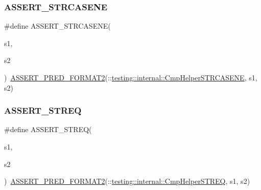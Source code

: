 \mbox{\label{_obj__test_2lib_2googletest-release-1_88_81_2googletest_2include_2gtest_2gtest_8h_ac3d2c3836b103068a050f32585b2aaad}} 
\subsubsection{\texorpdfstring{ASSERT\_STRCASENE}{ASSERT\_STRCASENE}}
{\footnotesize\ttfamily \#define A\+S\+S\+E\+R\+T\+\_\+\+S\+T\+R\+C\+A\+S\+E\+NE(\begin{DoxyParamCaption}\item[{}]{s1,  }\item[{}]{s2 }\end{DoxyParamCaption})~\mbox{\hyperlink{_obj__test_2lib_2googletest-release-1_88_81_2googletest_2include_2gtest_2gtest__pred__impl_8h_ac452685a1a98ea3d96eb956a062ee210}{A\+S\+S\+E\+R\+T\+\_\+\+P\+R\+E\+D\+\_\+\+F\+O\+R\+M\+A\+T2}}(\+::\mbox{\hyperlink{namespacetesting_1_1internal_a7e31d489f06ab8f6a81a7729f0c377e7}{testing\+::internal\+::\+Cmp\+Helper\+S\+T\+R\+C\+A\+S\+E\+NE}}, s1, s2)}

\mbox{\label{_obj__test_2lib_2googletest-release-1_88_81_2googletest_2include_2gtest_2gtest_8h_a74f4189ea570bab9a65d47104659ef9c}} 
\subsubsection{\texorpdfstring{ASSERT\_STREQ}{ASSERT\_STREQ}}
{\footnotesize\ttfamily \#define A\+S\+S\+E\+R\+T\+\_\+\+S\+T\+R\+EQ(\begin{DoxyParamCaption}\item[{}]{s1,  }\item[{}]{s2 }\end{DoxyParamCaption})~\mbox{\hyperlink{_obj__test_2lib_2googletest-release-1_88_81_2googletest_2include_2gtest_2gtest__pred__impl_8h_ac452685a1a98ea3d96eb956a062ee210}{A\+S\+S\+E\+R\+T\+\_\+\+P\+R\+E\+D\+\_\+\+F\+O\+R\+M\+A\+T2}}(\+::\mbox{\hyperlink{namespacetesting_1_1internal_a711a396ed8f636ecd14a850a89d181b6}{testing\+::internal\+::\+Cmp\+Helper\+S\+T\+R\+EQ}}, s1, s2)}


